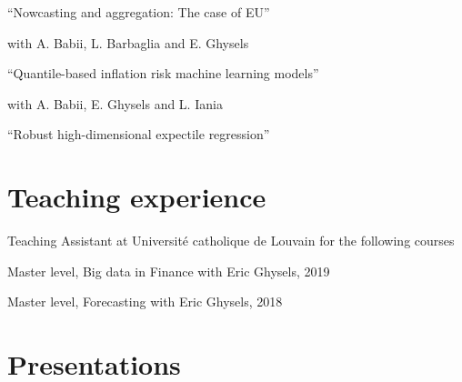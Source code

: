 \documentclass[10pt]{article}
\begin{document}
	\smallskip
	
	\hspace{1em}``Nowcasting and aggregation: The case of EU''
	
	\hspace{2em} with A. Babii, L. Barbaglia and E. Ghysels 
	
	\smallskip
	
	\hspace{1em}``Quantile-based inﬂation risk machine learning models''

	\smallskip
	
	\vspace{-0.5em}
	
	\hspace{2em}{\small(supersedes ``Quantile-based inﬂation risk models'')}
	
	\hspace{2em} with A. Babii, E. Ghysels and L. Iania
	
	\smallskip
	\hspace{1em}``Robust high-dimensional expectile regression''
	\smallskip 
	
	
	\section*{Teaching experience}
	\vspace{-0.5em}
	
	\hspace{1em} Teaching Assistant at Universit\'e catholique de Louvain for the following courses
	
	\hspace{2em} Master level, Big data in Finance with Eric Ghysels, 2019
	
	\hspace{2em} Master level, Forecasting with Eric Ghysels, 2018
	
	\section*{Presentations}
	\vspace{-2.5em}
	
\end{document}
